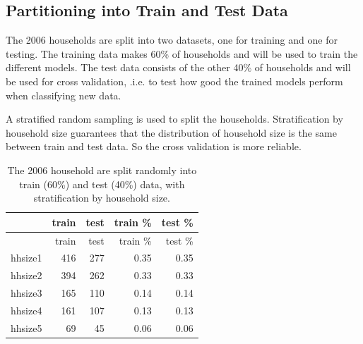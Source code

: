 \documentclass[]{article}
\newenvironment{Shaded}{\begin{snugshade}}{\end{snugshade}}
\newcommand{\DataTypeTok}[1]{\textcolor[rgb]{0.13,0.29,0.53}{#1}}
\newcommand{\DecValTok}[1]{\textcolor[rgb]{0.00,0.00,0.81}{#1}}
\newcommand{\FloatTok}[1]{\textcolor[rgb]{0.00,0.00,0.81}{#1}}
\newcommand{\KeywordTok}[1]{\textcolor[rgb]{0.13,0.29,0.53}{\textbf{#1}}}
\newcommand{\NormalTok}[1]{#1}
\newcommand{\OperatorTok}[1]{\textcolor[rgb]{0.81,0.36,0.00}{\textbf{#1}}}
\newcommand{\OtherTok}[1]{\textcolor[rgb]{0.56,0.35,0.01}{#1}}
\newcommand{\StringTok}[1]{\textcolor[rgb]{0.31,0.60,0.02}{#1}}
\begin{document}
\hypertarget{partitioning-into-train-and-test-data}{%
\subsection{Partitioning into Train and Test
Data}\label{partitioning-into-train-and-test-data}}

The 2006 households are split into two datasets, one for training and
one for testing. The training data makes 60\% of households and will be
used to train the different models. The test data consists of the other
40\% of households and will be used for cross validation, .i.e. to test
how good the trained models perform when classifying new data.

\begin{Shaded}
\end{Shaded}

A stratified random sampling is used to split the households.
Stratification by household size guarantees that the distribution of
household size is the same between train and test data. So the cross
validation is more reliable.

\begin{longtable}[]{@{}lrrrr@{}}
\caption{\label{tab:tab6} The 2006 household are split randomly into
train (60\%) and test (40\%) data, with stratification by household
size.}\tabularnewline
\toprule
& train & test & train \% & test \%\tabularnewline
\midrule
\endfirsthead
\toprule
& train & test & train \% & test \%\tabularnewline
\midrule
\endhead
hhsize1 & 416 & 277 & 0.35 & 0.35\tabularnewline
hhsize2 & 394 & 262 & 0.33 & 0.33\tabularnewline
hhsize3 & 165 & 110 & 0.14 & 0.14\tabularnewline
hhsize4 & 161 & 107 & 0.13 & 0.13\tabularnewline
hhsize5 & 69 & 45 & 0.06 & 0.06\tabularnewline
\bottomrule
\end{longtable}
\end{document}
